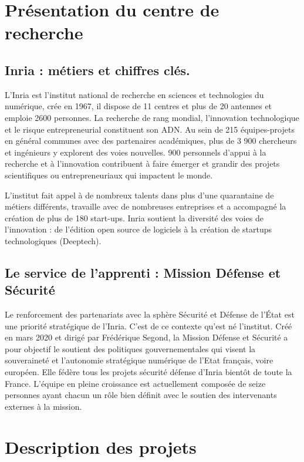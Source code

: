 \section{Présentation du centre de recherche}
\label{chap:sectionone}
\sloppy


\subsection{Inria : métiers et chiffres clés.}

L’Inria est l’institut national de recherche en sciences et technologies du numérique, crée en 1967, il dispose de 11 centres et plus de 20 antennes et emploie 2600 personnes. La recherche de rang mondial, l’innovation technologique et le risque entrepreneurial constituent son ADN.
Au sein de 215 équipes-projets en général communes avec des partenaires académiques, plus de 3 900 chercheurs et ingénieurs y explorent des voies nouvelles. 900 personnels d’appui à la recherche et à l’innovation contribuent à faire émerger et grandir des projets scientifiques ou entrepreneuriaux qui impactent le monde.

L’institut fait appel à de nombreux talents dans plus d’une quarantaine de métiers différents, travaille avec de nombreuses entreprises et a accompagné la création de plus de 180 start-ups.
Inria soutient la diversité des voies de l’innovation : de l’édition open source de logiciels à la création de startups technologiques (Deeptech).


\subsection{Le service de l’apprenti : Mission Défense et Sécurité}

Le renforcement des partenariats avec la sphère Sécurité et Défense de l’État est une priorité stratégique de l’Inria. C’est de ce contexte qu’est né l’institut. Créé en mars 2020 et dirigé par Frédérique Segond, la Mission Défense et Sécurité a pour objectif le soutient des politiques gouvernementales qui visent la souveraineté et l’autonomie stratégique numérique de l’Etat français, voire européen. Elle fédère tous les projets sécurité défense d’Inria bientôt de toute la France.
L’équipe en pleine croissance est actuellement composée de seize personnes ayant chacun un rôle bien définit avec le soutien des intervenants externes à la mission.

\section{Description des projets}

